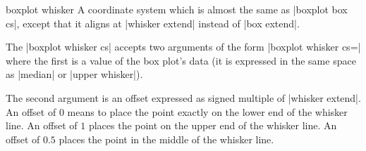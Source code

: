 \begin{coordinatesystem}{boxplot whisker}%
    A coordinate system which is almost the same as |boxplot box cs|, except
    that it aligns at |whisker extend| instead of |box extend|.

   The |boxplot whisker cs| accepts two arguments of the form
   |boxplot whisker cs=| where
   the first is a value of the box plot's data (it is expressed in the same
   space as |median| or |upper whisker|).

    The second argument is an offset expressed as signed multiple of
    |whisker extend|. An offset of $0$ means to place the point exactly on the
    lower end of the whisker line. An offset of $1$ places the point on the
    upper end of the whisker line. An offset of $0.5$ places the point in the
    middle of the whisker line.
\begin{codeexample}[]
\end{codeexample}
\end{coordinatesystem}

%
%
%


